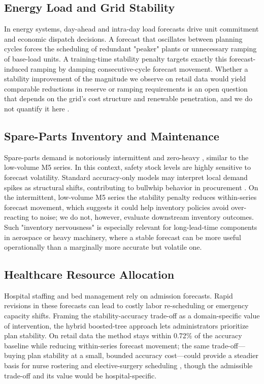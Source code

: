 \documentclass[10pt,conference]{IEEEtran}
\begin{document}
\subsection{Energy Load and Grid Stability}
In energy systems, day-ahead and intra-day load forecasts drive unit commitment and economic dispatch decisions. A forecast that oscillates between planning cycles forces the scheduling of redundant "peaker" plants or unnecessary ramping of base-load units. A training-time stability penalty targets exactly this forecast-induced ramping by damping consecutive-cycle forecast movement. Whether a stability improvement of the magnitude we observe on retail data would yield comparable reductions in reserve or ramping requirements is an open question that depends on the grid's cost structure and renewable penetration, and we do not quantify it here \cite{deCarolis2016loadForecasting}.

\subsection{Spare-Parts Inventory and Maintenance}
Spare-parts demand is notoriously intermittent and zero-heavy \cite{croston1972intermittent,fan2023spareParts}, similar to the low-volume M5 series. In this context, safety stock levels are highly sensitive to forecast volatility. Standard accuracy-only models may interpret local demand spikes as structural shifts, contributing to bullwhip behavior in procurement \cite{lee1997bullwhip}. On the intermittent, low-volume M5 series the stability penalty reduces within-series forecast movement, which suggests it could help inventory policies avoid over-reacting to noise; we do not, however, evaluate downstream inventory outcomes. Such "inventory nervousness" is especially relevant for long-lead-time components in aerospace or heavy machinery, where a stable forecast can be more useful operationally than a marginally more accurate but volatile one.

\subsection{Healthcare Resource Allocation}
Hospital staffing and bed management rely on admission forecasts. Rapid revisions in these forecasts can lead to costly labor re-scheduling or emergency capacity shifts. Framing the stability-accuracy trade-off as a domain-specific value of intervention, the hybrid boosted-tree approach lets administrators prioritize plan stability. On retail data the method stays within 0.72\% of the accuracy baseline while reducing within-series forecast movement; the same trade-off---buying plan stability at a small, bounded accuracy cost---could provide a steadier basis for nurse rostering and elective-surgery scheduling \cite{inpatientBed2022forecasting}, though the admissible trade-off and its value would be hospital-specific.
\end{document}
